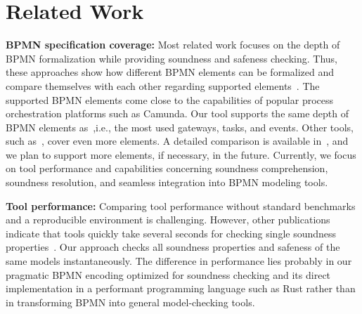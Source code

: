 \documentclass[runningheads]{llncs}
\begin{document}
\section{Related Work} \label{sec:related-work}

\textbf{BPMN specification coverage:}
Most related work focuses on the depth of BPMN formalization while providing soundness and safeness checking.
Thus, these approaches show how different BPMN elements can be formalized and compare themselves with each other regarding supported elements~\cite{corradiniFormalApproachAnalysis2021,houhouFirstOrderLogicVerification2022,krauterFormalizationAnalysisBPMN2023,krauterHigherorderTransformationApproach2023}.
The supported BPMN elements come close to the capabilities of popular process orchestration platforms such as Camunda.
Our tool supports the same depth of BPMN elements as~\cite{corradiniFormalApproachAnalysis2021},i.e., the most used gateways, tasks, and events.
Other tools, such as~\cite{krauterHigherorderTransformationApproach2023}, cover even more elements.
A detailed comparison is available in~\cite{noauthorgivenBPM2024Artifacts2024}, and we plan to support more elements, if necessary, in the future.
Currently, we focus on tool performance and capabilities concerning soundness comprehension, soundness resolution, and seamless integration into BPMN modeling tools.

\textbf{Tool performance:}
Comparing tool performance without standard benchmarks and a reproducible environment is challenging.
However, other publications indicate that tools quickly take several seconds for checking single soundness properties~\cite{corradiniFormalApproachAnalysis2021,houhouFirstOrderLogicVerification2022,krauterHigherorderTransformationApproach2023}.
Our approach checks all soundness properties and safeness of the same models instantaneously.
The difference in performance lies probably in our pragmatic BPMN encoding optimized for soundness checking and its direct implementation in a performant programming language such as Rust rather than in transforming BPMN into general model-checking tools.
\end{document}
